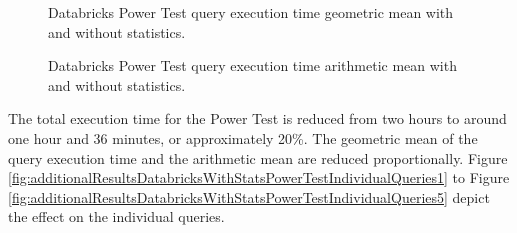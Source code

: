 \begin{figure}
   \begin{center}
   \end{center}
   \caption{Databricks Power Test query execution time geometric mean with and without statistics.}
   \label{fig:additionalResultsDatabricksWithStatsPowerTestGeomean}
\end{figure}

\begin{figure}
   \begin{center}
   \end{center}
   \caption{Databricks Power Test query execution time arithmetic mean with and without statistics.}
   \label{fig:additionalResultsDatabricksWithStatsPowerTestArithmeticMean}
\end{figure}

The total execution time for the Power Test is reduced from two hours to around one hour and 36 minutes, or approximately 20\%. The geometric mean of the query execution time and the arithmetic mean are reduced proportionally. Figure \ref{fig:additionalResultsDatabricksWithStatsPowerTestIndividualQueries1} to Figure \ref{fig:additionalResultsDatabricksWithStatsPowerTestIndividualQueries5} depict the effect on the individual queries.

